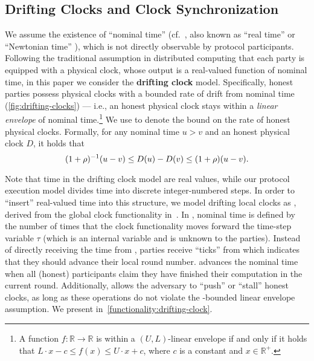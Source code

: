 \subsection{Drifting Clocks and Clock Synchronization}
\label{subsec:drifting-clocks-and-synchronization}

We assume the existence of ``nominal time'' (cf.~\cite{EC:BGKRZ21,TCC:GarKiaShe22}, also known as ``real time'' or ``Newtonian time'' \cite{JCSS:DHS86}), which is not directly observable by protocol participants.
%
Following the traditional assumption in distributed computing that each party is equipped with a physical clock, whose output is a real-valued function of nominal time, in this paper we consider the \textbf{drifting clock} model.
%
Specifically, honest parties possess physical clocks with a bounded rate of drift from nominal time (\cref{fig:drifting-clocks}) --- i.e., an honest physical clock stays within a \emph{linear envelope} of nominal time.\footnote{A function $f: \mathbb{R} \rightarrow \mathbb{R}$ is within a $(U, L)$-linear envelope if and only if it holds that $L \cdot x - c \leq f(x)\leq U \cdot x + c$, where $c$ is a constant and $x \in \mathbb{R}^+$.}
%
We use \clockDrift to denote the bound on the rate of honest physical clocks.
% 
Formally, for any nominal time $u > v$ and an honest physical clock $D$, it holds that
%
\[ (1 + \rho)^{-1} (u - v) \le D(u) - D(v) \le (1 + \rho) (u - v). \]



Note that time in the drifting clock model are real values, while our protocol execution model divides time into discrete integer-numbered steps.
%
In order to ``insert'' real-valued time into this structure, we model drifting local clocks as \funcDriftingClock, derived from the global clock functionality in~\cite{TCC:KMTZ13}.
%
In \funcDriftingClock, nominal time is defined by the number of times that the clock functionality moves forward the time-step variable $\tau$ (which is an internal variable and is unknown to the parties).
%
Instead of directly receiving the time from \funcDriftingClock, parties receive ``ticks'' from \funcDriftingClock which indicates that they should advance their local round number.
%
\funcDriftingClock advances the nominal time when all (honest) participants claim they have finished their computation in the current round.
%
Additionally, \funcDriftingClock allows the adversary to ``push'' or ``stall'' honest clocks, as long as these operations do not violate the \clockDrift-bounded linear envelope assumption.
%
We present \funcDriftingClock in~\cref{functionality:drifting-clock}.

